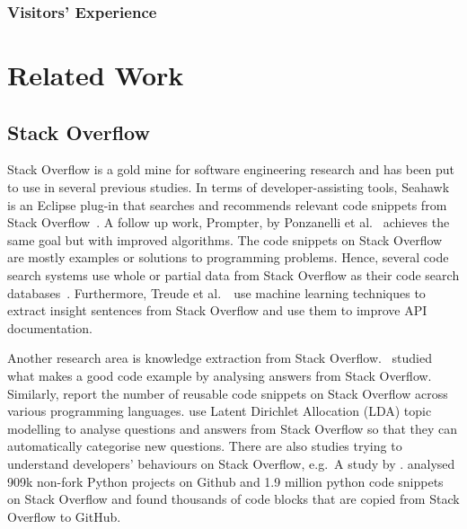 \documentclass{svjour3}                     %
\begin{document}
\subsubsection{Visitors' Experience}

\section{Related Work}

\subsection{Stack Overflow}

Stack Overflow is a gold mine for software engineering research and has been put
to use in several previous studies. In terms of developer-assisting tools,
Seahawk is an Eclipse plug-in that searches and recommends relevant code
snippets from Stack Overflow~\citep{Ponzanelli2013}. A follow up work, Prompter,
by Ponzanelli et al.~\citep{Ponzanelli2014} achieves the same goal but with
improved algorithms. The code snippets on Stack Overflow are mostly examples or
solutions to programming problems. Hence, several code search systems use whole
or partial data from Stack Overflow as their code search
databases~\citep{Keivanloo2014,Park2014,
	Stolee2014,Subramanian2013,Diamantopoulos2015}. Furthermore, Treude et
al.~\cite{Treude2016}~use machine learning techniques to extract insight
sentences from Stack Overflow and use them to improve API documentation.

Another research area is knowledge extraction from Stack Overflow.
\cite{Nasehi2012}~studied what makes a good code example by analysing answers
from Stack Overflow. Similarly, \cite{Yang2016} report the number of reusable
code snippets on Stack Overflow across various programming languages.
\cite{Wang2013_StackOverflow} use Latent Dirichlet Allocation (LDA) topic
modelling to analyse questions and answers from Stack Overflow so that they can
automatically categorise new questions. There are also studies trying to
understand developers' behaviours on Stack Overflow, e.g.~A study by
\cite{Movshovitz-Attias2013,Rosen2016,Choetkiertikul2015,Bosu2013}.
\cite{Yang2017} analysed 909k non-fork Python projects on Github and 1.9
million python code snippets on Stack Overflow and found thousands of 
code blocks that are copied from Stack Overflow to GitHub.
\end{document}
